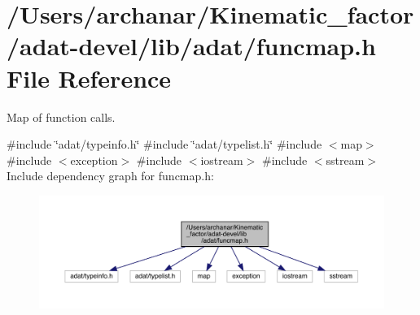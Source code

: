 \hypertarget{adat-devel_2lib_2adat_2funcmap_8h}{}\section{/\+Users/archanar/\+Kinematic\+\_\+factor/adat-\/devel/lib/adat/funcmap.h File Reference}
\label{adat-devel_2lib_2adat_2funcmap_8h}


Map of function calls.  


{\ttfamily \#include \char`\"{}adat/typeinfo.\+h\char`\"{}}\newline
{\ttfamily \#include \char`\"{}adat/typelist.\+h\char`\"{}}\newline
{\ttfamily \#include $<$map$>$}\newline
{\ttfamily \#include $<$exception$>$}\newline
{\ttfamily \#include $<$iostream$>$}\newline
{\ttfamily \#include $<$sstream$>$}\newline
Include dependency graph for funcmap.\+h\+:
\nopagebreak
\begin{figure}[H]
\begin{center}
\leavevmode
\includegraphics[width=350pt]{d6/d7e/adat-devel_2lib_2adat_2funcmap_8h__incl}
\end{center}
\end{figure}
